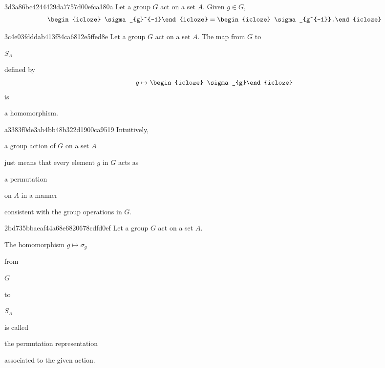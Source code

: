\begin{note}{3d3a86bc4244429da7757d00efca180a}
    Let a group \({ G }\) act on a set \({ A }\).
    Given \({ g \in G }\),
    \[
        \begin{icloze}{2}\sigma_{g}^{-1}\end{icloze} = \begin{icloze}{1}\sigma_{g^{-1}}.\end{icloze}
    \]
\end{note}

\begin{note}{3c4e03fdddab413f84ca6812e5ffed8e}
    Let a group \({ G }\) act on a set \({ A }\).
    The map from \({ G }\) to \begin{icloze}{3}\({ S_{A} }\)\end{icloze} defined by
    \[
        g \mapsto \begin{icloze}{2}\sigma_{g}\end{icloze}
    \]
    is \begin{icloze}{1}a homomorphism.\end{icloze}
\end{note}

\begin{note}{a3383f0de3ab4bb48b322d1900ca9519}
    Intuitively, \begin{icloze}{3}a group action of \({ G }\) on a set \({ A }\)\end{icloze} just means that every element \({ g }\) in \({ G }\) acts as \begin{icloze}{1}a permutation\end{icloze} on \({ A }\) in a manner \begin{icloze}{2}consistent with the group operations in \({ G }\).\end{icloze}
\end{note}

\begin{note}{2bd735bbaeaf44a68e6820678cdfd0ef}
    Let a group \({ G }\) act on a set \({ A }\).
    \begin{icloze}{3}The homomorphism \({ g \mapsto \sigma_{g} }\)\end{icloze} from \begin{icloze}{4}\({ G }\)\end{icloze} to \begin{icloze}{4}\({ S_{A} }\)\end{icloze} is called \begin{icloze}{1}the permutation representation\end{icloze} \begin{icloze}{2}associated to the given action.\end{icloze}
\end{note}

